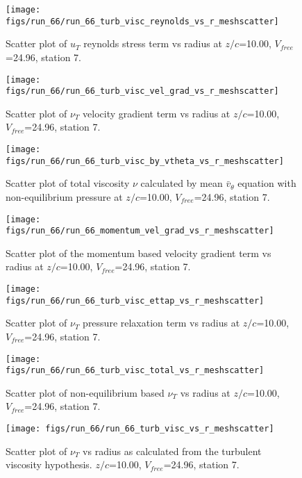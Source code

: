 \begin{figure}[H]
\centering
\texttt{[image: figs/run\_66/run\_66\_turb\_visc\_reynolds\_vs\_r\_meshscatter]}
\caption{Scatter plot of $
u_T$ reynolds stress term vs radius at $z/c$=10.00, $V_{free}$=24.96, station 7.}
\end{figure}


\begin{figure}[H]
\centering
\texttt{[image: figs/run\_66/run\_66\_turb\_visc\_vel\_grad\_vs\_r\_meshscatter]}
\caption{Scatter plot of $\nu_T$ velocity gradient term vs radius at $z/c$=10.00, $V_{free}$=24.96, station 7.}
\end{figure}


\begin{figure}[H]
\centering
\texttt{[image: figs/run\_66/run\_66\_turb\_visc\_by\_vtheta\_vs\_r\_meshscatter]}
\caption{Scatter plot of total viscosity $\nu$ calculated by mean $\bar{v}_{\theta}$ equation with non-equilibrium pressure at $z/c$=10.00, $V_{free}$=24.96, station 7.}
\end{figure}


\begin{figure}[H]
\centering
\texttt{[image: figs/run\_66/run\_66\_momentum\_vel\_grad\_vs\_r\_meshscatter]}
\caption{Scatter plot of the momentum based velocity gradient term vs radius at $z/c$=10.00, $V_{free}$=24.96, station 7.}
\end{figure}


\begin{figure}[H]
\centering
\texttt{[image: figs/run\_66/run\_66\_turb\_visc\_ettap\_vs\_r\_meshscatter]}
\caption{Scatter plot of $\nu_T$ pressure relaxation term vs radius at $z/c$=10.00, $V_{free}$=24.96, station 7.}
\end{figure}


\begin{figure}[H]
\centering
\texttt{[image: figs/run\_66/run\_66\_turb\_visc\_total\_vs\_r\_meshscatter]}
\caption{Scatter plot of non-equilibrium based $\nu_T$ vs radius at $z/c$=10.00, $V_{free}$=24.96, station 7.}
\end{figure}


\begin{figure}[H]
\centering
\texttt{[image: figs/run\_66/run\_66\_turb\_visc\_vs\_r\_meshscatter]}
\caption{Scatter plot of $\nu_T$ vs radius as calculated from the turbulent viscosity hypothesis. $z/c$=10.00, $V_{free}$=24.96, station 7.}
\end{figure}


